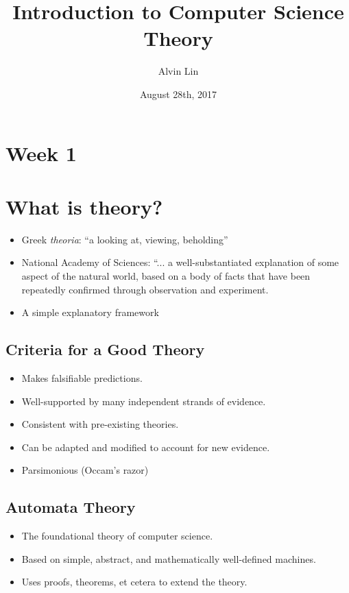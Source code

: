 \documentclass[letterpaper, 12pt]{math}
\title{Introduction to Computer Science Theory}
\author{Alvin Lin}
\date{August 28th, 2017}
\begin{document}
\maketitle

\section*{Week 1}

\section*{What is theory?}
\begin{itemize}
  \item Greek \textit{theoria}: ``a looking at, viewing, beholding''
  \item National Academy of Sciences: ``... a well-substantiated
    explanation of some aspect of the natural world, based on a body of
    facts that have been repeatedly confirmed through observation and
    experiment.
  \item A simple explanatory framework
\end{itemize}

\subsection*{Criteria for a Good Theory}
\begin{itemize}
  \item Makes falsifiable predictions.
  \item Well-supported by many independent strands of evidence.
  \item Consistent with pre-existing theories.
  \item Can be adapted and modified to account for new evidence.
  \item Parsimonious (Occam's razor)
\end{itemize}

\subsection*{Automata Theory}
\begin{itemize}
  \item The foundational theory of computer science.
  \item Based on simple, abstract, and mathematically well-defined
    machines.
  \item Uses proofs, theorems, et cetera to extend the theory.
\end{itemize}
\end{document}

